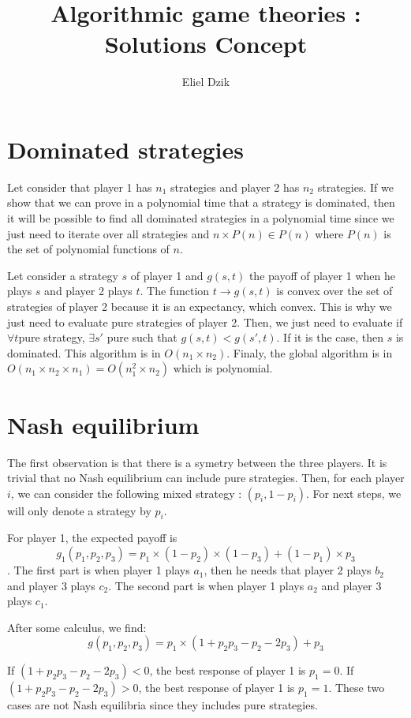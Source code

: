 \documentclass[11pt, a4paper]{article}
\title{Algorithmic game theories : Solutions Concept}
\author{Eliel Dzik}
\begin{document}
\date{}
\maketitle


\section{Dominated strategies}
Let consider that player 1 has $n_1$ strategies and player 2 has $n_2$ strategies.
If we show that we can prove in a polynomial time that a strategy is dominated,
 then it will be possible to find all dominated strategies in a polynomial time since we just 
 need to iterate over all strategies and $ n \times P(n) \in P(n) $ where $P(n)$ is the set of polynomial functions of $n$.

Let consider a strategy $s$ of player 1 and $g(s,t)$ the payoff of player 1 when he plays $s$ and player 2 plays $t$.
The function $t \rightarrow g(s,t)$ is convex over the set of strategies of player 2 because it is an expectancy, which convex.
This is why we just need to evaluate pure strategies of player 2.
Then, we just need to evaluate if $\forall t $pure strategy, $\exists s'$ pure such that $ g(s,t) < g(s',t)$.
If it is the case, then $s$ is dominated. This algorithm is in $O(n_1 \times n_2)$.
Finaly, the global algorithm is in $O(n_1 \times n_2 \times n_1 ) = O(n_1^2 \times n_2)$ which is polynomial.

\section{Nash equilibrium}
The first observation is that there is a symetry between the three players. 
It is trivial that no Nash equilibrium can include pure strategies.
Then, for each player $i$, we can consider the following mixed strategy : $(p_i, 1-p_i)$.
For next steps, we will only denote a strategy by $p_i$.

For player 1, the expected payoff is $$ g_1(p_1, p_2, p_3) = p_1 \times (1-p_2) \times (1-p_3) + (1-p_1) \times p_3 $$.
The first part is when player 1 plays $a_1$, then he needs that player 2 plays $b_2$ and player 3 plays $c_2$.
The second part is when player 1 plays $a_2$ and player 3 plays $c_1$.

After some calculus, we find:
$$
g(p_1, p_2, p_3) = p_1 \times (1 + p_2p_3 - p_2 - 2p_3) + p_3
$$

If $ (1 + p_2p_3 - p_2 - 2p_3) < 0 $, the best response of player 1 is $p_1 = 0$.
If $ (1 + p_2p_3 - p_2 - 2p_3) > 0 $, the best response of player 1 is $p_1 = 1$.
These two cases are not Nash equilibria since they includes pure strategies.
\end{document}
